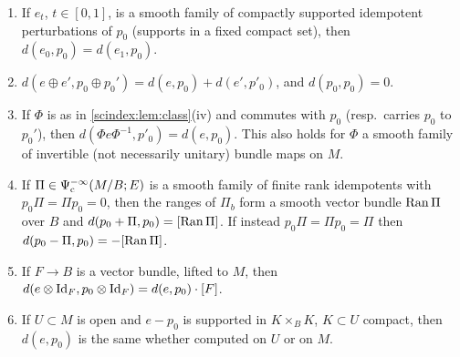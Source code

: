 \begin{proposition}\label{scindex:prop:d}
  \begin{enumerate}[label=(d\arabic*)]
  \item\label{scindex:d-homotopy} If $e_t$, $t\in[0,1]$, is a smooth family of
    compactly supported idempotent perturbations of $p_0$ (supports in a fixed
    compact set), then $d(e_0,p_0)=d(e_1,p_0)$.
  \item\label{scindex:d-sum} $d(e\oplus e',p_0\oplus p_0')=d(e,p_0)+d(e',p'_0)$,
    and $d(p_0,p_0)=0$.
  \item\label{scindex:d-conj} If $\Phi$ is as in \cref{scindex:lem:class}(iv) and
    commutes with $p_0$ (resp.\ carries $p_0$ to $p_0'$), then
    $d(\Phi e\Phi^{-1},p'_0)=d(e,p_0)$. This also holds for $\Phi$ a smooth family of
    invertible (not necessarily unitary) bundle maps on $M$.
  \item\label{scindex:d-finite} If $\Pi\in\Psi^{-\infty}_{\mathrm c}(M/B;E)$ is
    a smooth family of finite rank idempotents with $p_0\Pi=\Pi p_0=0$, then the
    ranges of $\Pi_b$ form a smooth vector bundle $\operatorname{Ran}\Pi$ over $B$ and
    $d(p_0+\Pi,p_0)=[\operatorname{Ran}\Pi]$. If instead $p_0\Pi=\Pi p_0=\Pi$ then
    $d(p_0-\Pi,p_0)=-[\operatorname{Ran}\Pi]$.
  \item\label{scindex:d-module} If $F\to B$ is a vector bundle, lifted to $M$,
    then $d(e\otimes\operatorname{Id}_F,p_0\otimes\operatorname{Id}_F)=d(e,p_0)\cdot[F]$.
  \item\label{scindex:d-excision} If $U\subset M$ is open and $e-p_0$ is supported
    in $K\times_BK$, $K\subset U$ compact, then $d(e,p_0)$ is the same whether
    computed on $U$ or on $M$.
  \end{enumerate}
\end{proposition}
